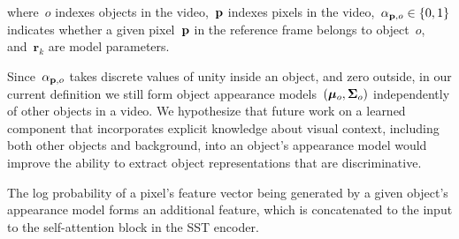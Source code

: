 where~$o$ indexes objects in the video,~$\mathbf{p}{}$ indexes pixels in the
video,~$\alpha_{\mathbf{p}{}, o} \in \{0, 1\}$ indicates whether a given
pixel~$\mathbf{p}{}$ in the reference frame belongs to object~$o$,
and~$\mathbf{r}_k$ are model parameters.

Since~$\alpha_{\mathbf{p}{}, o}$ takes discrete values of unity inside an object,
and zero outside, in our current definition we still form object appearance
models~$(\bm{\mu}_o{}, \bm{\Sigma}_o{})$ independently of other objects in a video.
We hypothesize that future work on a learned component that incorporates
explicit knowledge about visual context, including both other objects and
background, into an object's appearance model would improve the ability to
extract object representations that are discriminative.

The log probability of a pixel's feature vector being generated by a given
object's appearance model forms an additional feature, which is concatenated to
the input to the self-attention block in the SST encoder.








